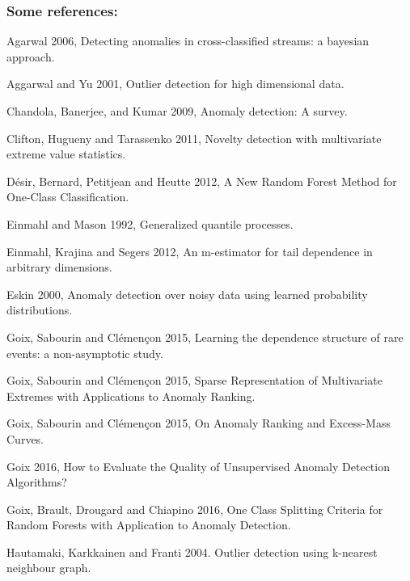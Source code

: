\documentclass[9pt]{beamer}
\begin{document}
\begin{frame}
\frametitle{Some references:}
\begin{itemize}
\footnotesize{
\item Agarwal 2006, Detecting anomalies in cross-classified streams: a bayesian approach.

\item Aggarwal and Yu 2001, Outlier detection for high dimensional data.


\item Chandola, Banerjee, and Kumar 2009, Anomaly detection: A survey.


\item Clifton, Hugueny and Tarassenko 2011, Novelty detection with multivariate extreme value statistics.

\item Désir, Bernard, Petitjean and Heutte 2012, A New Random Forest Method for One-Class Classification.

\item Einmahl and Mason 1992, Generalized quantile processes.


\item Einmahl, Krajina and Segers 2012, An m-estimator for tail dependence in arbitrary dimensions.

\item Eskin 2000,  Anomaly detection over noisy data using learned probability distributions.

\item Goix, Sabourin and Clémençon 2015, Learning the dependence structure of rare events: a non-asymptotic study.

\item Goix, Sabourin and Clémençon 2015, Sparse Representation of Multivariate Extremes with Applications to Anomaly Ranking.

\item Goix, Sabourin and Clémençon 2015, On Anomaly Ranking and Excess-Mass Curves.

\item Goix 2016, How to Evaluate the Quality of Unsupervised Anomaly Detection Algorithms?

\item Goix, Brault, Drougard and Chiapino 2016, One Class Splitting Criteria for Random Forests with Application to Anomaly Detection.

\item Hautamaki, Karkkainen and Franti 2004. Outlier detection using k-nearest neighbour graph.

}
\end{itemize}
\end{frame}
\end{document}
